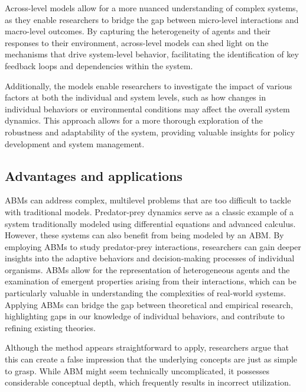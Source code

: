     Across-level models allow for a more nuanced understanding of complex systems, as they enable researchers to bridge the gap between micro-level interactions and macro-level outcomes. By capturing the heterogeneity of agents and their responses to their environment, across-level models can shed light on the mechanisms that drive system-level behavior, facilitating the identification of key feedback loops and dependencies within the system.

    Additionally, the models enable researchers to investigate the impact of various factors at both the individual and system levels, such as how changes in individual behaviors or environmental conditions may affect the overall system dynamics. This approach allows for a more thorough exploration of the robustness and adaptability of the system, providing valuable insights for policy development and system management.

\subsection{Advantages and applications}
    ABMs can address complex, multilevel problems that are too difficult to tackle with traditional models. Predator-prey dynamics serve as a classic example of a system traditionally modeled using differential equations and advanced calculus. However, these systems can also benefit from being modeled by an ABM\cite{railsback2020pred-prey}. By employing ABMs to study predator-prey interactions, researchers can gain deeper insights into the adaptive behaviors and decision-making processes of individual organisms. ABMs allow for the representation of heterogeneous agents and the examination of emergent properties arising from their interactions, which can be particularly valuable in understanding the complexities of real-world systems. Applying ABMs can bridge the gap between theoretical and empirical research, highlighting gaps in our knowledge of individual behaviors, and contribute to refining existing theories.

    Although the method appears straightforward to apply, researchers argue that this can create a false impression that the underlying concepts are just as simple to grasp. While ABM might seem technically uncomplicated, it possesses considerable conceptual depth, which frequently results in incorrect utilization.